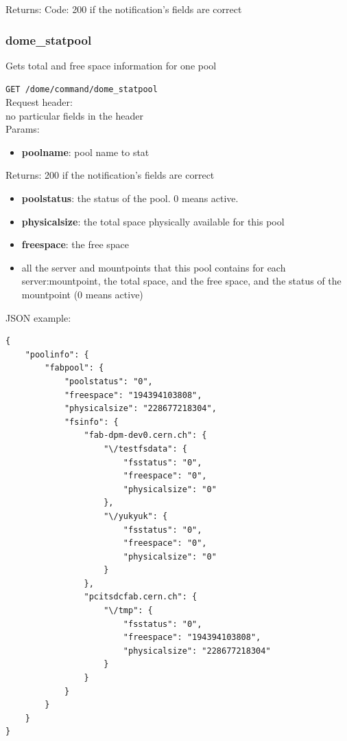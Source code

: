 \documentclass[a4paper,10pt]{scrreprt}
\begin{document}
Returns:
Code: 200 if the notification's fields are correct


\subsubsection{dome\_statpool}
Gets total and free space information for one pool

\lstinline"GET /dome/command/dome_statpool"\\

Request header:\\
 no particular fields in the header\\

Params:
\begin{itemize}
 \item \textbf{poolname}: pool name to stat
\end{itemize}

Returns: 200 if the notification's fields are correct
\begin{itemize}
 \item \textbf{poolstatus}: the status of the pool. 0 means active.
 \item \textbf{physicalsize}: the total space physically available for this pool
 \item \textbf{freespace}: the free space


 \item all the server and mountpoints that this pool contains
 \subitem for each server:mountpoint, the total space, and the free space, and the status of the mountpoint (0 means active)
\end{itemize}

JSON example:\\
\begin{lstlisting}
{
    "poolinfo": {
        "fabpool": {
            "poolstatus": "0",
            "freespace": "194394103808",
            "physicalsize": "228677218304",
            "fsinfo": {
                "fab-dpm-dev0.cern.ch": {
                    "\/testfsdata": {
                        "fsstatus": "0",
                        "freespace": "0",
                        "physicalsize": "0"
                    },
                    "\/yukyuk": {
                        "fsstatus": "0",
                        "freespace": "0",
                        "physicalsize": "0"
                    }
                },
                "pcitsdcfab.cern.ch": {
                    "\/tmp": {
                        "fsstatus": "0",
                        "freespace": "194394103808",
                        "physicalsize": "228677218304"
                    }
                }
            }
        }
    }
}
\end{lstlisting}
\end{document}
